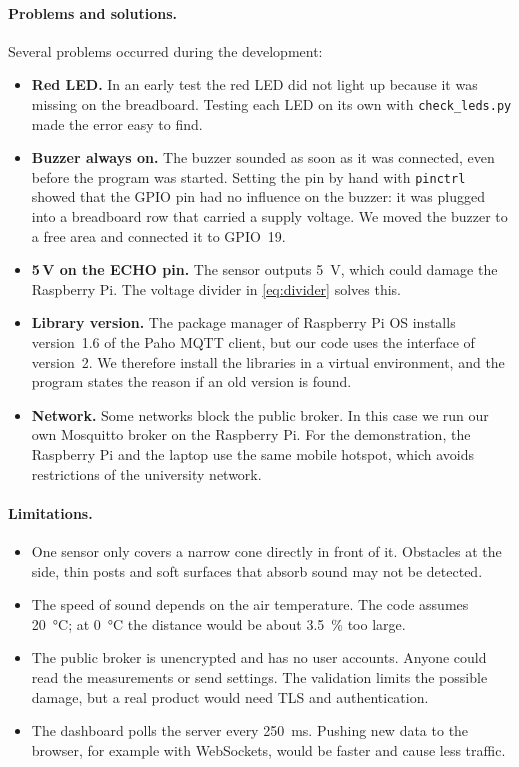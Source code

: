 \documentclass[11pt,a4paper]{article}
\begin{document}
\paragraph{Problems and solutions.} Several problems occurred during the
development:
\begin{itemize}
  \item \textbf{Red LED.} In an early test the red LED did not light up because
        it was missing on the breadboard. Testing each LED on its own with
        \texttt{check\_leds.py} made the error easy to find.
  \item \textbf{Buzzer always on.} The buzzer sounded as soon as it was
        connected, even before the program was started. Setting the pin by hand
        with \texttt{pinctrl} showed that the GPIO pin had no influence on the
        buzzer: it was plugged into a breadboard row that carried a supply
        voltage. We moved the buzzer to a free area and connected it to GPIO~19.
  \item \textbf{5\,V on the ECHO pin.} The sensor outputs \qty{5}{\volt}, which
        could damage the Raspberry Pi. The voltage divider in
        \cref{eq:divider} solves this.
  \item \textbf{Library version.} The package manager of Raspberry Pi OS installs
        version~1.6 of the Paho MQTT client, but our code uses the interface of
        version~2. We therefore install the libraries in a virtual environment,
        and the program states the reason if an old version is found.
  \item \textbf{Network.} Some networks block the public broker. In this case we
        run our own Mosquitto broker on the Raspberry Pi. For the
        demonstration, the Raspberry Pi and the laptop use the same mobile
        hotspot, which avoids restrictions of the university network.
\end{itemize}

\paragraph{Limitations.}
\begin{itemize}
  \item One sensor only covers a narrow cone directly in front of it. Obstacles
        at the side, thin posts and soft surfaces that absorb sound may not be
        detected.
  \item The speed of sound depends on the air temperature. The code assumes
        \qty{20}{\celsius}; at \qty{0}{\celsius} the distance would be about
        \qty{3.5}{\percent} too large.
  \item The public broker is unencrypted and has no user accounts. Anyone could
        read the measurements or send settings. The validation limits the
        possible damage, but a real product would need TLS and authentication.
  \item The dashboard polls the server every \qty{250}{\milli\second}. Pushing
        new data to the browser, for example with WebSockets, would be faster
        and cause less traffic.
\end{itemize}
\end{document}

